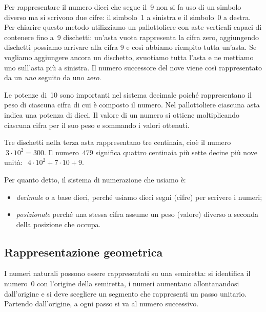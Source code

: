 Per rappresentare il numero dieci che segue il~9 non si fa uso di un 
simbolo diverso ma si scrivono due cifre: il simbolo~1 a sinistra e il 
simbolo~0 a destra. 
Per chiarire questo metodo utilizziamo un pallottoliere con aste 
verticali capaci di contenere fino a~9 dischetti: 
un'asta vuota rappresenta la cifra zero, aggiungendo dischetti possiamo 
arrivare alla cifra 9 e così abbiamo riempito tutta un'asta. 
Se vogliamo aggiungere ancora un dischetto, svuotiamo tutta l'asta e ne 
mettiamo uno sull'asta più a sinistra.
Il numero successore del nove viene così rappresentato da un \emph{uno} 
seguito da uno \emph{zero}.


Le potenze di~10 sono importanti nel sistema decimale poiché 
rappresentano il peso di ciascuna cifra di cui è composto il numero. 
Nel pallottoliere ciascuna asta indica una potenza di dieci. 
Il valore di un numero si ottiene moltiplicando ciascuna cifra per il
suo peso e sommando i valori ottenuti.

Tre dischetti nella terza asta rappresentano tre centinaia, 
cioè il numero~\(~3 \cdot 10^2=300\).
Il numero~\(479\) significa quattro centinaia più sette decine più 
nove unità:~\(~4 \cdot 10^2 + 7 \cdot 10 + 9\).

Per quanto detto, il sistema di numerazione che usiamo è:

\begin{itemize} [noitemsep]
\item \emph{decimale} o a base dieci, 
perché usiamo dieci segni (cifre) per scrivere i numeri;
\item \emph{posizionale} 
perché una stessa cifra assume un peso (valore) diverso a seconda della 
posizione che occupa.
\end{itemize}

\subsection{Rappresentazione geometrica}
I numeri naturali possono essere rappresentati su una semiretta: 
si identifica il numero~0 con l'origine della semiretta, 
i numeri aumentano allontanandosi dall'origine e si deve scegliere un 
segmento che rappresenti un passo unitario.
Partendo dall'origine, a ogni passo si va al numero successivo.

